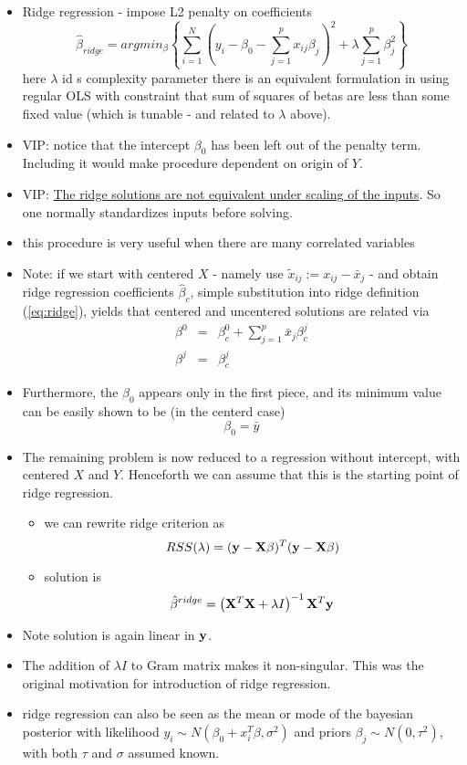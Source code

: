 \documentclass[a4paper]{report}
\newcommand{\<}{\textless}
\newcommand{\bX}{{\bf{X}}}
\newcommand{\by}{{\bf{y}}}
\renewcommand{\>}{\textgreater}
\begin{document}
\begin{itemize}
  \item Ridge regression - impose L2 penalty on coefficients
    \begin{equation}
      \hat{\beta}_{ridge} = argmin_{\beta} \left\{ \sum_{i=1}^N\left(y_i - \beta_0 - \sum_{j=1}^p x_{ij}\beta_j  \right)^2 + \lambda \sum_{j=1}^p \beta_j^2\right\} \label{eq:ridge}
    \end{equation}
    \subitem here $\lambda$ id s complexity parameter
    \subitem there is an equivalent formulation in using regular OLS with constraint that sum of squares of betas are less than some fixed value (which is tunable - and related to $\lambda$ above).
  \item VIP: notice that the intercept $\beta_0$ has been left out of the penalty term. Including it would make procedure dependent on origin of $Y$.
  \item VIP: \underline{The ridge solutions are not equivalent under scaling of the inputs}. So one normally standardizes inputs before solving.
  \item this procedure is very useful when there are many correlated variables
  \item Note: if we start with centered $X$ - namely use $\tilde{x}_{ij} := x_{ij} - \bar{x}_j$  - and obtain ridge regression coefficients $\hat{\beta}_c$, simple substitution into ridge definition (\ref{eq:ridge}), yields that centered and uncentered solutions are related via
    \begin{eqnarray}
      \beta^0 &=& \beta_c^0 + \sum_{j=1}^p \bar{x}_j\beta_c^j \label{eq:3.5} \\
      \beta^j &=& \beta_c^j
    \end{eqnarray}
  \item Furthermore, the $\beta_0$ appears only in the first piece, and its minimum value can be easily shown to be (in the centerd case)
    $$ \beta_0 = \bar{y} $$
  \item The remaining problem is now reduced to a regression without intercept, with centered $X$ and $Y$. Henceforth we can assume that this is the starting point of ridge regression.
    \begin{itemize}
      \item we can rewrite ridge criterion as
	$$ RSS(\lambda) = (\by - \bX \beta)^T(\by - \bX \beta) $$
      \item solution is
	$$ \hat{\beta}^{ridge} = \left( \bX^T\bX + \lambda I\right)^{-1}\bX^T\by $$
    \end{itemize}
  \item Note solution is again linear in $\by$.
  \item The addition of $\lambda I$ to Gram matrix makes it non-singular. This was the original motivation for introduction of ridge regression.
  \item ridge regression can also be seen as the mean or mode of the bayesian posterior with likelihood $ y_i \sim N(\beta_0 + x_i^T \beta, \sigma^2)$ and priors $\beta_j \sim N(0, \tau^2)$, with both $\tau$ and $\sigma$ assumed known.
\end{itemize}
\end{document}
